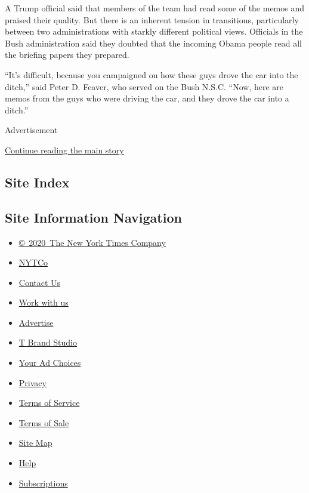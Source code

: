A Trump official said that members of the team had read some of the
memos and praised their quality. But there is an inherent tension in
transitions, particularly between two administrations with starkly
different political views. Officials in the Bush administration said
they doubted that the incoming Obama people read all the briefing papers
they prepared.

``It's difficult, because you campaigned on how these guys drove the car
into the ditch,'' said Peter D. Feaver, who served on the Bush N.S.C.
``Now, here are memos from the guys who were driving the car, and they
drove the car into a ditch.''

Advertisement

\protect\hyperlink{after-bottom}{Continue reading the main story}

\hypertarget{site-index}{%
\subsection{Site Index}\label{site-index}}

\hypertarget{site-information-navigation}{%
\subsection{Site Information
Navigation}\label{site-information-navigation}}

\begin{itemize}
\tightlist
\item
  \href{https://help.nytimes.com/hc/en-us/articles/115014792127-Copyright-notice}{©~2020~The
  New York Times Company}
\end{itemize}

\begin{itemize}
\tightlist
\item
  \href{https://www.nytco.com/}{NYTCo}
\item
  \href{https://help.nytimes.com/hc/en-us/articles/115015385887-Contact-Us}{Contact
  Us}
\item
  \href{https://www.nytco.com/careers/}{Work with us}
\item
  \href{https://nytmediakit.com/}{Advertise}
\item
  \href{http://www.tbrandstudio.com/}{T Brand Studio}
\item
  \href{https://www.nytimes.com/privacy/cookie-policy\#how-do-i-manage-trackers}{Your
  Ad Choices}
\item
  \href{https://www.nytimes.com/privacy}{Privacy}
\item
  \href{https://help.nytimes.com/hc/en-us/articles/115014893428-Terms-of-service}{Terms
  of Service}
\item
  \href{https://help.nytimes.com/hc/en-us/articles/115014893968-Terms-of-sale}{Terms
  of Sale}
\item
  \href{https://spiderbites.nytimes.com}{Site Map}
\item
  \href{https://help.nytimes.com/hc/en-us}{Help}
\item
  \href{https://www.nytimes.com/subscription?campaignId=37WXW}{Subscriptions}
\end{itemize}
